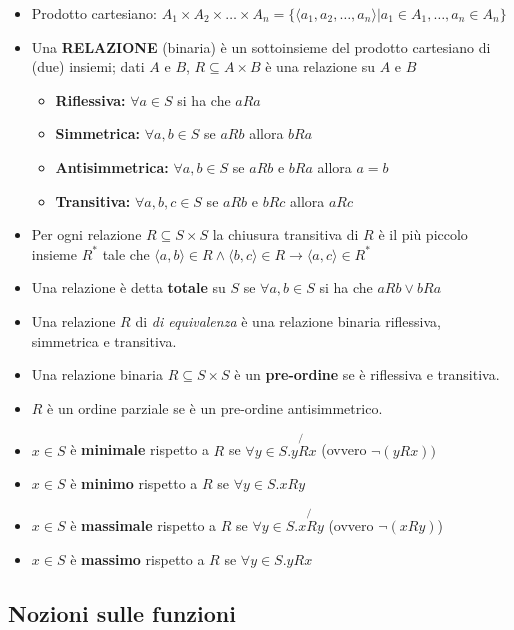 \documentclass[a4paper]{article}
\begin{document}
\begin{itemize}
    \item Prodotto cartesiano: $A_1 \times A_2 \times \dots \times A_n = \{\langle a_1,a_2,\dots,a_n \rangle | a_1 \in A_1,\dots, a_n \in A_n\}$
    \item Una \textbf{RELAZIONE} (binaria) è un sottoinsieme del prodotto cartesiano di (due) insiemi; dati $A$ e $B$, $R \subseteq A \times B$ 
    è una relazione su $A$ e $B$ 
    \begin{itemize}
        \item \textbf{Riflessiva:} $\forall a \in S$ si ha che $aRa$
        \item \textbf{Simmetrica:} $\forall a,b \in S$ se $aRb$ allora $bRa$
        \item \textbf{Antisimmetrica:} $\forall a,b \in S$ se $aRb$ e $bRa$ allora $a=b$
        \item \textbf{Transitiva:} $\forall a,b,c \in S$ se $aRb$ e $bRc$ allora $aRc$
    \end{itemize}  
    \item Per ogni relazione $R \subseteq S \times S$ la chiusura transitiva di $R$ è il più piccolo 
    insieme $R^*$ tale che $\langle a,b \rangle \in R \land \langle b,c \rangle \in R \rightarrow \langle a,c \rangle \in R^*$  
    \item Una relazione è detta \textbf{totale} su $S$ se $\forall a,b \in S$ si ha che $aRb \lor bRa$
    \item Una relazione $R$ di \textit{di equivalenza} è una relazione binaria riflessiva, simmetrica e transitiva.
    \item Una relazione binaria $R \subseteq S \times S$ è un \textbf{pre-ordine} se è riflessiva e transitiva.
    \item $R$ è un ordine parziale se è un pre-ordine antisimmetrico.
    \item $x \in S$ è \textbf{minimale} rispetto a $R$ se $\forall y \in S . y \not{R} x$ (ovvero $\neg(yRx))$
    \item $x \in S$ è \textbf{minimo} rispetto a $R$ se $\forall y \in S . xRy$
    \item $x \in S$ è \textbf{massimale} rispetto a $R$ se $\forall y \in S . x \not{R} y$ (ovvero $\neg(xRy)$)
    \item $x \in S$ è \textbf{massimo} rispetto a $R$ se $\forall y \in S . yRx$
\end{itemize}

\subsection{Nozioni sulle funzioni}
\end{document}
